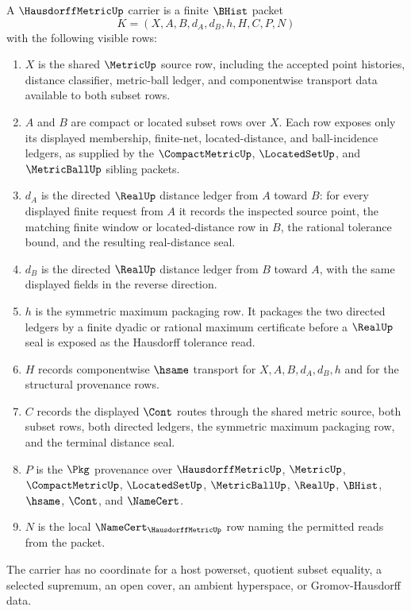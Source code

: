 \begin{definition}
\label{def:hausdorff-metric-carrier}
A $\HausdorffMetricUp$ carrier is a finite $\BHist$ packet
$$
K=(X,A,B,d_A,d_B,h,H,C,P,N)
$$
with the following visible rows:
\begin{enumerate}
\item $X$ is the shared $\MetricUp$ source row, including the accepted point histories, distance classifier, metric-ball ledger, and componentwise transport data available to both subset rows.
\item $A$ and $B$ are compact or located subset rows over $X$. Each row exposes only its displayed membership, finite-net, located-distance, and ball-incidence ledgers, as supplied by the $\CompactMetricUp$, $\LocatedSetUp$, and $\MetricBallUp$ sibling packets.
\item $d_A$ is the directed $\RealUp$ distance ledger from $A$ toward $B$: for every displayed finite request from $A$ it records the inspected source point, the matching finite window or located-distance row in $B$, the rational tolerance bound, and the resulting real-distance seal.
\item $d_B$ is the directed $\RealUp$ distance ledger from $B$ toward $A$, with the same displayed fields in the reverse direction.
\item $h$ is the symmetric maximum packaging row. It packages the two directed ledgers by a finite dyadic or rational maximum certificate before a $\RealUp$ seal is exposed as the Hausdorff tolerance read.
\item $H$ records componentwise $\hsame$ transport for $X,A,B,d_A,d_B,h$ and for the structural provenance rows.
\item $C$ records the displayed $\Cont$ routes through the shared metric source, both subset rows, both directed ledgers, the symmetric maximum packaging row, and the terminal distance seal.
\item $P$ is the $\Pkg$ provenance over $\HausdorffMetricUp$, $\MetricUp$, $\CompactMetricUp$, $\LocatedSetUp$, $\MetricBallUp$, $\RealUp$, $\BHist$, $\hsame$, $\Cont$, and $\NameCert$.
\item $N$ is the local $\NameCert_{\HausdorffMetricUp}$ row naming the permitted reads from the packet.
\end{enumerate}
The carrier has no coordinate for a host powerset, quotient subset equality, a selected supremum, an open cover, an ambient hyperspace, or Gromov-Hausdorff data.
\end{definition}

